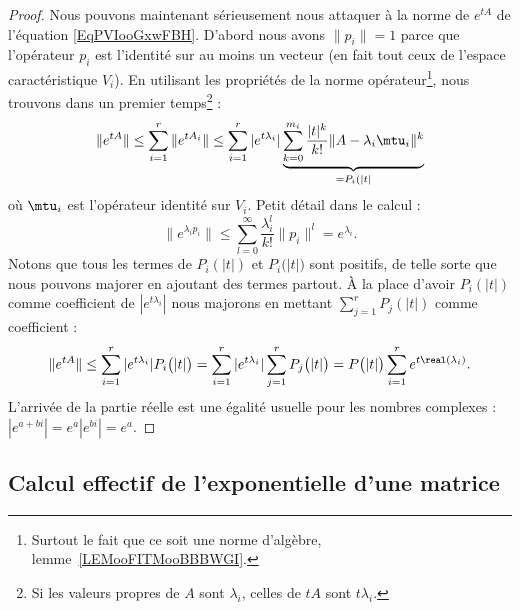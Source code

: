 \begin{proof}
	Nous pouvons maintenant sérieusement nous attaquer à la norme de \(  e^{tA}\) de l'équation \eqref{EqPVIooGxwFBH}. D'abord nous avons \( \| p_i \|=1\) parce que l'opérateur \( p_i\) est l'identité sur au moins un vecteur (en fait tout ceux de l'espace caractéristique \( V_i\)). En utilisant les propriétés de la norme opérateur\footnote{Surtout le fait que ce soit une norme d'algèbre, lemme~\ref{LEMooFITMooBBBWGI}.}, nous trouvons dans un premier temps\footnote{Si les valeurs propres de \( A\) sont \( \lambda_i\), celles de \( tA\) sont \( t\lambda_i\).} :
	\begin{equation}
		\|  e^{tA} \|\leq \sum_{i=1}^r\|  e^{tA_i} \|\leq \sum_{i=1}^r|  e^{t\lambda_i} |\underbrace{\sum_{k=0}^{m_i}\frac{ | t |^k }{ k! }\| A-\lambda_i\mtu_i \|^k}_{=P_i( | t | }
	\end{equation}
	où \( \mtu_i\) est l'opérateur identité sur \( V_i\). Petit détail dans le calcul :
	\begin{equation}
		\|  e^{\lambda_ip_i} \|\leq \sum_{l=0}^{\infty}\frac{ \lambda_i^l }{ k! }\| p_i \|^l= e^{\lambda_i}.
	\end{equation}
	Notons que tous les termes de \( P_i(| t |)\) et \( P_i\big( | t | \big)\) sont positifs, de telle sorte que nous pouvons majorer en ajoutant des termes partout. À la place d'avoir \( P_i(| t |)\) comme coefficient de \( |  e^{t\lambda_i} |\) nous majorons en mettant \( \sum_{j=1}^rP_j(| t |)\) comme coefficient :
	\begin{equation}
		\|  e^{tA} \|\leq    \sum_{i=1}^r|  e^{t\lambda_i} |P_i\big( | t | \big)
		=\sum_{i=1}^r|  e^{t\lambda_i} |\sum_{j=1}^rP_j\big( | t | \big)=P\big( | t | \big)\sum_{i=1}^r e^{t\real(\lambda_i)}.
	\end{equation}
	L'arrivée de la partie réelle est une égalité usuelle pour les nombres complexes : \( |  e^{a+bi} |= e^{a}|  e^{bi} |= e^{a}\).
\end{proof}

\subsection{Calcul effectif de l'exponentielle d'une matrice}
\label{SUBSECooGAHVooBRUFub}

